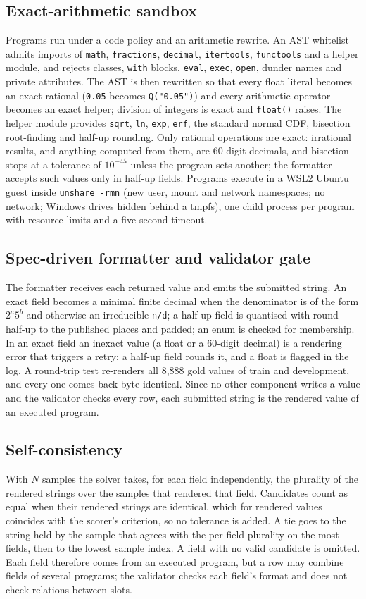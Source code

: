 \documentclass[conference]{IEEEtran}
\newcommand{\id}[1]{\texttt{#1}}
\begin{document}
\subsection{Exact-arithmetic sandbox}\label{sec:sandbox}
Programs run under a code policy and an arithmetic rewrite. An AST whitelist admits imports of \id{math}, \id{fractions}, \id{decimal}, \id{itertools}, \id{functools} and a helper module, and rejects classes, \id{with} blocks, \id{eval}, \id{exec}, \id{open}, dunder names and private attributes. The AST is then rewritten so that every float literal becomes an exact rational (\id{0.05} becomes \id{Q("0.05")}) and every arithmetic operator becomes an exact helper; division of integers is exact and \id{float()} raises. The helper module provides \id{sqrt}, \id{ln}, \id{exp}, \id{erf}, the standard normal CDF, bisection root-finding and half-up rounding. Only rational operations are exact: irrational results, and anything computed from them, are 60-digit decimals, and bisection stops at a tolerance of $10^{-45}$ unless the program sets another; the formatter accepts such values only in half-up fields. Programs execute in a WSL2 Ubuntu guest inside \id{unshare -rmn} (new user, mount and network namespaces; no network; Windows drives hidden behind a tmpfs), one child process per program with resource limits and a five-second timeout.

\subsection{Spec-driven formatter and validator gate}
The formatter receives each returned value and emits the submitted string. An exact field becomes a minimal finite decimal when the denominator is of the form $2^a5^b$ and otherwise an irreducible \id{n/d}; a half-up field is quantised with round-half-up to the published places and padded; an enum is checked for membership. In an exact field an inexact value (a float or a 60-digit decimal) is a rendering error that triggers a retry; a half-up field rounds it, and a float is flagged in the log. A round-trip test re-renders all 8,888 gold values of train and development, and every one comes back byte-identical. Since no other component writes a value and the validator checks every row, each submitted string is the rendered value of an executed program.

\subsection{Self-consistency}\label{sec:voting}
With $N$ samples the solver takes, for each field independently, the plurality of the rendered strings over the samples that rendered that field. Candidates count as equal when their rendered strings are identical, which for rendered values coincides with the scorer's criterion, so no tolerance is added. A tie goes to the string held by the sample that agrees with the per-field plurality on the most fields, then to the lowest sample index. A field with no valid candidate is omitted. Each field therefore comes from an executed program, but a row may combine fields of several programs; the validator checks each field's format and does not check relations between slots.
\end{document}

